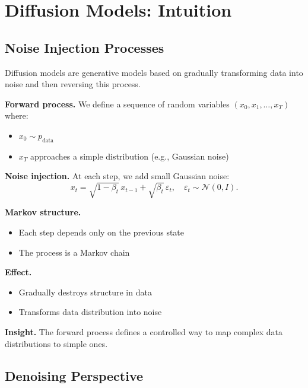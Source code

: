 \chapter{Diffusion Models: Intuition}

\section{Noise Injection Processes}

Diffusion models are generative models based on gradually transforming data into noise and then reversing this process.

\medskip

\noindent
\textbf{Forward process.}  
We define a sequence of random variables $(x_0, x_1, \dots, x_T)$ where:
\begin{itemize}
    \item $x_0 \sim p_{\text{data}}$
    \item $x_T$ approaches a simple distribution (e.g., Gaussian noise)
\end{itemize}

\medskip

\noindent
\textbf{Noise injection.}  
At each step, we add small Gaussian noise:
\[
x_t = \sqrt{1 - \beta_t} \, x_{t-1} + \sqrt{\beta_t} \, \varepsilon_t,
\quad \varepsilon_t \sim \mathcal{N}(0, I).
\]

\medskip

\noindent
\textbf{Markov structure.}
\begin{itemize}
    \item Each step depends only on the previous state
    \item The process is a Markov chain
\end{itemize}

\medskip

\noindent
\textbf{Effect.}
\begin{itemize}
    \item Gradually destroys structure in data
    \item Transforms data distribution into noise
\end{itemize}

\medskip

\noindent
\textbf{Insight.}  
The forward process defines a controlled way to map complex data distributions to simple ones.

\section{Denoising Perspective}

